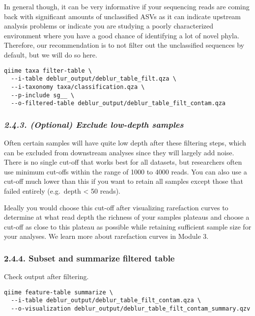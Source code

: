 \documentclass[
]{book}
\begin{document}
In general though, it can be very informative if your sequencing reads are coming back with significant amounts of unclassified ASVs as it can indicate upstream analysis problems or indicate you are studying a poorly characterized environment where you have a good chance of identifying a lot of novel phyla. Therefore, our recommendation is to not filter out the unclassified sequences by default, but we will do so here.

\begin{verbatim}
qiime taxa filter-table \
  --i-table deblur_output/deblur_table_filt.qza \
  --i-taxonomy taxa/classification.qza \
  --p-include sg__ \
  --o-filtered-table deblur_output/deblur_table_filt_contam.qza
\end{verbatim}

\subsubsection{\texorpdfstring{\emph{2.4.3. (Optional) Exclude low-depth samples}}{2.4.3. (Optional) Exclude low-depth samples}}\label{optional-exclude-low-depth-samples-1}

Often certain samples will have quite low depth after these filtering steps, which can be excluded from downstream analyses since they will largely add noise. There is no single cut-off that works best for all datasets, but researchers often use minimum cut-offs within the range of 1000 to 4000 reads. You can also use a cut-off much lower than this if you want to retain all samples except those that failed entirely (e.g.~depth \textless{} 50 reads).

Ideally you would choose this cut-off after visualizing rarefaction curves to determine at what read depth the richness of your samples plateaus and choose a cut-off as close to this plateau as possible while retaining sufficient sample size for your analyses. We learn more about rarefaction curves in Module 3.

\subsubsection{2.4.4. Subset and summarize filtered table}\label{subset-and-summarize-filtered-table-1}

Check output after filtering.

\begin{verbatim}
qiime feature-table summarize \
  --i-table deblur_output/deblur_table_filt_contam.qza \
  --o-visualization deblur_output/deblur_table_filt_contam_summary.qzv
\end{verbatim}
\end{document}
